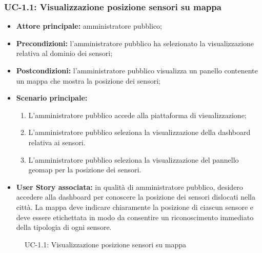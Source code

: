 \documentclass[8pt]{article}
\begin{document}
\subsubsection*{UC-1.1: Visualizzazione posizione sensori su mappa}
\begin{itemize}
    \item \textbf{Attore principale:} amministratore pubblico;
    \item \textbf{Precondizioni:} l’amministratore pubblico ha selezionato la visualizzazione
        relativa al dominio dei sensori;
    \item \textbf{Postcondizioni:} l'amministratore pubblico visualizza un panello contenente un
        mappa che mostra la posizione dei sensori;
    \item \textbf{Scenario principale:}
    \begin{enumerate}
      \item L’amministratore pubblico accede alla piattaforma di visualizzazione;
      \item L’amministratore pubblico seleziona la visualizzazione della dashboard relativa ai sensori.
      \item L’amministratore pubblico seleziona la visualizzazione del pannello geomap per la
          posizione dei sensori.
    \end{enumerate}
    \item \textbf{User Story associata:} in qualità di amministratore pubblico, desidero accedere
        alla dashboard per conoscere la posizione dei sensori dislocati nella città. La mappa deve indicare chiaramente la posizione di ciascun sensore e deve essere etichettata in modo da consentire un riconoscimento immediato della tipologia di ogni sensore.
\end{itemize}

\begin{figure}[ht!]
    \centering
    \caption{UC-1.1: Visualizzazione posizione sensori su mappa}
    \label{fig:UC-1.1: Visualizzazione posizione sensori su mappa}
\end{figure}
\end{document}
